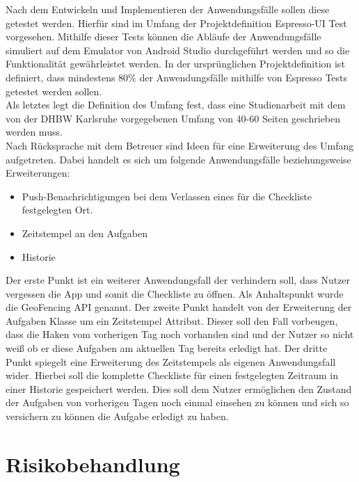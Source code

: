 Nach dem Entwickeln und Implementieren der Anwendungsfälle sollen diese getestet werden. Hierfür sind im Umfang der Projektdefinition Espresso-\ac{UI} Test vorgesehen. Mithilfe dieser Tests können die Abläufe der Anwendungsfälle simuliert auf dem Emulator von Android Studio durchgeführt werden und so die Funktionalität gewährleistet werden. In der ursprünglichen Projektdefinition ist definiert, dass mindestens 80\% der Anwendungsfälle mithilfe von Espresso Tests getestet werden sollen.\\
Als letztes legt die Definition des Umfang fest, dass eine Studienarbeit mit dem von der \ac{DHBW} Karlsruhe vorgegebenen Umfang von 40-60 Seiten geschrieben werden muss.\\

Nach Rücksprache mit dem Betreuer sind Ideen für eine Erweiterung des Umfang aufgetreten. Dabei handelt es sich um folgende Anwendungsfälle beziehungsweise Erweiterungen:

\begin{itemize}
	\item Push-Benachrichtigungen bei dem Verlassen eines für die Checkliste festgelegten Ort.
	\item Zeitstempel an den Aufgaben
	\item Historie
\end{itemize}

Der erste Punkt ist ein weiterer Anwendungsfall der verhindern soll, dass Nutzer vergessen die App und somit die Checkliste zu öffnen. Als Anhaltspunkt wurde die GeoFencing \ac{API} genannt. Der zweite Punkt handelt von der Erweiterung der Aufgaben Klasse um ein Zeitstempel Attribut. Dieser soll den Fall vorbeugen, dass die Haken vom vorherigen Tag noch vorhanden sind und der Nutzer so nicht weiß ob er diese Aufgaben am aktuellen Tag bereits erledigt hat. Der dritte Punkt spiegelt eine Erweiterung des Zeitstempels als eigenen Anwendungsfall wider. Hierbei soll die komplette Checkliste für einen festgelegten Zeitraum in einer Historie gespeichert werden. Dies soll dem Nutzer ermöglichen den Zustand der Aufgaben von vorherigen Tagen noch einmal einsehen zu können und sich so versichern zu können die Aufgabe erledigt zu haben.

\section{Risikobehandlung}\label{sec:risiko}

